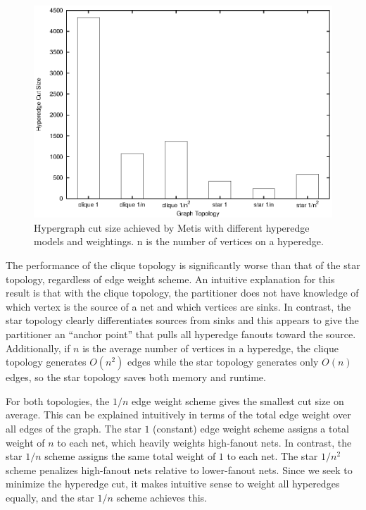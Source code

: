 \begin{figure}[!htbp]
\centering
\includegraphics[width=\linewidth]{graph_topology_cutsize.eps}
\caption{Hypergraph cut size achieved by Metis with different hyperedge models and weightings. n is the number of vertices on a hyperedge.}
\label{fig:graph_topology_cutsize}
\end{figure}

The performance of the clique topology is significantly worse than that of the star topology, regardless of edge weight scheme. An intuitive explanation for this result is that with the clique topology, the partitioner does not have knowledge of which vertex is the source of a net and which vertices are sinks. In contrast, the star topology clearly differentiates sources from sinks and this appears to give the partitioner an “anchor point” that pulls all hyperedge fanouts toward the source. Additionally, if $n$ is the average number of vertices in a hyperedge, the clique topology generates $O(n^2)$ edges while the star topology generates only $O(n)$ edges, so the star topology saves both memory and runtime.

For both topologies, the $1/n$ edge weight scheme gives the smallest cut size on average. This can be explained intuitively in terms of the total edge weight over all edges of the graph. The star $1$ (constant) edge weight scheme assigns a total weight of $n$ to each net, which heavily weights high-fanout nets. In contrast, the star $1/n$ scheme assigns the same total weight of $1$ to each net. The star $1/n^2$ scheme penalizes high-fanout nets relative to lower-fanout nets. Since we seek to minimize the hyperedge cut, it makes intuitive sense to weight all hyperedges equally, and the star $1/n$ scheme achieves this.

